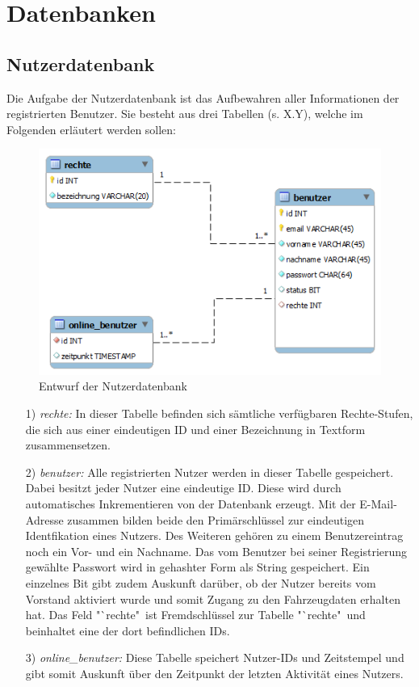\documentclass[fontsize = 12pt, paper = a4]{scrreprt}
\begin{document}
\section{Datenbanken}

\subsection{Nutzerdatenbank}

Die Aufgabe der Nutzerdatenbank ist das Aufbewahren aller Informationen der registrierten Benutzer. Sie besteht aus drei Tabellen (s. X.Y), welche im Folgenden erläutert werden sollen:

\begin{figure}[h]
\centering
\includegraphics[scale = 0.6]{nutzerdatenbank} 
\caption [Entwurf Nutzerdatenbank]{Entwurf der Nutzerdatenbank}
\end{figure} 

\newpage

\begin{itemize}
\item[1)] \textit{rechte:} 
In dieser Tabelle befinden sich sämtliche verfügbaren Rechte-Stufen, die sich aus einer eindeutigen ID und einer Bezeichnung in Textform zusammensetzen.

\item[2)] \textit{benutzer:} 
Alle registrierten Nutzer werden in dieser Tabelle gespeichert. Dabei besitzt jeder Nutzer eine eindeutige ID. Diese wird durch automatisches Inkrementieren von der Datenbank erzeugt. Mit der E-Mail-Adresse zusammen bilden beide den Primärschlüssel zur eindeutigen Identfikation eines Nutzers. Des Weiteren gehören zu einem Benutzereintrag noch ein Vor- und ein Nachname. Das vom Benutzer bei seiner Registrierung gewählte Passwort wird in gehashter Form als String gespeichert. Ein einzelnes Bit gibt zudem Auskunft darüber, ob der Nutzer bereits vom Vorstand aktiviert wurde und somit Zugang zu den Fahrzeugdaten erhalten hat. Das Feld "`rechte"\ ist Fremdschlüssel zur Tabelle "`rechte"\ und beinhaltet eine der dort befindlichen IDs.

\item[3)] \textit{online\_benutzer:} 
Diese Tabelle speichert Nutzer-IDs und Zeitstempel und gibt somit Auskunft über den Zeitpunkt der letzten Aktivität eines Nutzers.

\end{itemize}
\end{document}

